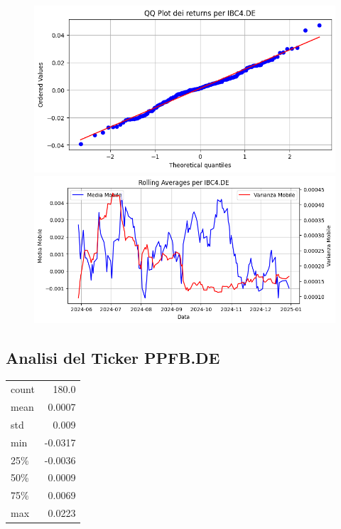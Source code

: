 \documentclass{article}%
\begin{document}
%


\begin{figure}[htbp]%
\begin{minipage}{0.48\textwidth}%
\includegraphics[width=\linewidth]{immagini_tickers/IBC4.DE_qq_plot.png}%
\end{minipage}%
\begin{minipage}{0.48\textwidth}%
\includegraphics[width=\linewidth]{immagini_tickers/IBC4.DE_rolling_averages.png}%
\end{minipage}%
\end{figure}

%
\subsection*{Analisi del Ticker PPFB.DE}%
\label{subsec:AnalisidelTickerPPFB.DE}%
\begin{tabular}{lr}%
count&180.0\\%
mean&0.0007\\%
std&0.009\\%
min&{-}0.0317\\%
25\%&{-}0.0036\\%
50\%&0.0009\\%
75\%&0.0069\\%
max&0.0223\\%
\end{tabular}%
\end{document}
